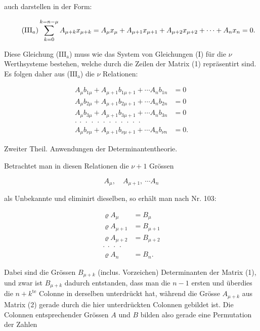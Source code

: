 \documentclass[11pt]{article}
\providecommand{\weberpage}[1]{}
\providecommand{\weq}[2]{\begin{equation}\tag{#1}#2\end{equation}}
\begin{document}
auch darstellen in der Form:

\weq{$\mathrm{III}_a$}{
\sum_{k=0}^{k=n-\mu} A_{\mu+k}x_{\mu+k} = A_\mu x_\mu + A_{\mu+1}x_{\mu+1} + A_{\mu+2}x_{\mu+2} + \cdots + A_n x_n = 0.
}

Diese Gleichung ($\mathrm{III_a}$) muss wie das System von Gleichungen (I) f\"ur die $\nu$ Werthsysteme bestehen, welche durch die Zeilen der Matrix (1) repr\"asentirt sind. Es folgen daher aus ($\mathrm{III_a}$) die $\nu$ Relationen:

\[
\begin{aligned}
A_\mu b_{1\mu} + A_{\mu+1} b_{1\mu+1} + \cdots A_n b_{1n} &= 0 \\
A_\mu b_{2\mu} + A_{\mu+1} b_{2\mu+1} + \cdots A_n b_{2n} &= 0 \\
A_\mu b_{3\mu} + A_{\mu+1} b_{3\mu+1} + \cdots A_n b_{3n} &= 0 \\
\cdot\ \cdot\ \cdot\ \cdot\ \cdot\ \cdot\ \cdot\ \cdot\ \cdot\ \cdot\ \cdot\ \cdot \\
A_\mu b_{\nu\mu} + A_{\mu+1} b_{\nu\mu+1} + \cdots A_n b_{\nu n} &= 0.
\end{aligned}
\]


\weberpage{112}
 \quad Zweiter Theil. Anwendungen der Determinantentheorie.

Betrachtet man in diesen Relationen die $\nu+1$ Gr\"ossen

\[
A_\mu,\quad A_{\mu+1},\ \cdots A_n
\]

als Unbekannte und eliminirt dieselben, so erh\"alt man nach Nr. 103:

\weq{A}{
\begin{aligned}
\varrho A_\mu &= B_\mu \\
\varrho A_{\mu+1} &= B_{\mu+1} \\
\varrho A_{\mu+2} &= B_{\mu+2} \\
\cdot\ \cdot\ \cdot\ \cdot \\
\varrho A_n &= B_n.
\end{aligned}
}

Dabei sind die Gr\"ossen $B_{\mu+k}$ (inclus. Vorzeichen) Determinanten der Matrix (1), und zwar ist $B_{\mu+k}$ dadurch entstanden, dass man die $n-1$ ersten und \"uberdies die $n+k^{\text{te}}$ Colonne in derselben unterdr\"uckt hat, w\"ahrend die Gr\"osse $A_{\mu+k}$ aus Matrix (2) gerade durch die hier unterdr\"uckten Colonnen gebildet ist. Die Colonnen entsprechender Gr\"ossen $A$ und $B$ bilden also gerade eine Permutation der Zahlen
\end{document}
